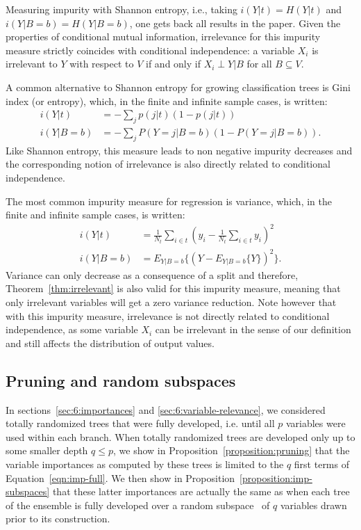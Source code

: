 Measuring impurity with Shannon entropy, i.e., taking $i(Y|t)=H(Y|t)$
and $i(Y|B=b)=H(Y|B=b)$, one gets back all results in the paper. Given the
properties of conditional mutual information, irrelevance for this
impurity measure strictly coincides with conditional independence: a
variable $X_i$ is irrelevant to $Y$ with respect to $V$ if and only if
$X_i\perp Y|B$ for all $B\subseteq V$.

A common alternative to Shannon entropy for growing classification
trees is Gini index (or entropy), which, in the finite and infinite
sample cases, is written:
\begin{align}
i(Y|t)&= -\sum_j p(j|t) (1-p(j|t))\\
i(Y|B=b)&= -\sum_j P(Y=j|B=b) (1-P(Y=j|B=b)).
\end{align}
Like Shannon entropy, this measure leads to non negative impurity
decreases and the corresponding notion of irrelevance is also directly
related to conditional independence.

The most common impurity measure for regression is variance, which, in
the finite and infinite sample cases, is written:
\begin{align}
i(Y|t)&=\frac{1}{N_t} \sum_{i\in t} (y_i-\frac{1}{N_t} \sum_{i\in t} y_i)^2\\
i(Y|B=b)&=E_{Y|B=b}\{(Y-E_{Y|B=b}\{Y\})^2\}.
\end{align}
Variance can only decrease as a consequence of a split and therefore,
Theorem~\ref{thm:irrelevant} is also valid for this impurity measure,
meaning that only irrelevant variables will get a zero variance
reduction. Note however that with this impurity measure, irrelevance
is not directly related to conditional independence, as some variable
$X_i$ can be irrelevant in the sense of our definition and still
affects the distribution of output values.


\subsection{Pruning and random subspaces}

In sections~\ref{sec:6:importances} and \ref{sec:6:variable-relevance}, we
considered totally randomized trees that were fully developed, i.e. until all
$p$ variables were used within each branch. When totally randomized trees are
developed only up to some smaller depth $q \leq p$, we show in
Proposition~\ref{proposition:pruning} that the variable importances as computed
by these trees is limited to the $q$ first terms of Equation~\ref{eqn:imp-full}.
We then show in Proposition~\ref{proposition:imp-subspaces} that these
latter importances are actually the same as when each tree of the ensemble is
fully developed over a random subspace~\citep{ho:1998} of $q$ variables
drawn prior to its construction.

